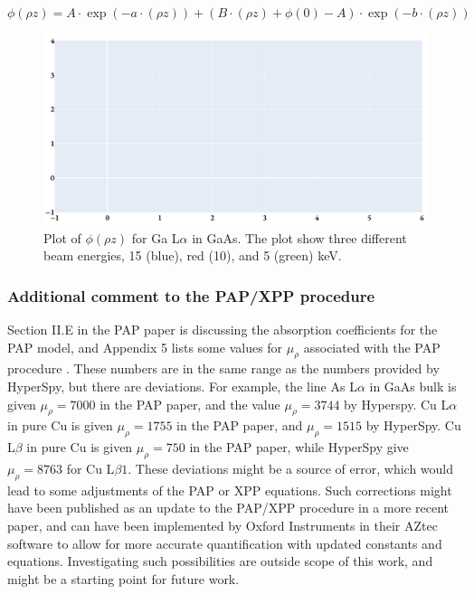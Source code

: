 
\begin{equation}
    \label{eq:theory:quantitative:pap:phi_of_rho_z}
    \phi (\rho z) = A \cdot \exp(- a \cdot (\rho z)) + (B \cdot (\rho z) + \phi(0) - A) \cdot \exp(- b \cdot (\rho z))
\end{equation}


\begin{figure}[htbp]
    \centering
    \includegraphics[width=0.8\linewidth]{figures/PAP_phi_of_rhoz.pdf}
    \caption{
        Plot of $\phi(\rho z)$ for Ga L$\alpha$ in GaAs.
        The plot show three different beam energies, 15 (blue), red (10), and 5 (green) keV.
    }
    \label{fig:pap:phi_of_rhoz}
\end{figure}






\subsubsection{Additional comment to the PAP/XPP procedure}

Section II.E in the PAP paper is discussing the absorption coefficients for the PAP model, and Appendix 5 lists some values for $\mu_\rho$ associated with the PAP procedure \cite{pap_1991}.
These numbers are in the same range as the numbers provided by HyperSpy, but there are deviations.
For example, the line As L$\alpha$ in GaAs bulk is given $\mu_\rho = 7000$ in the PAP paper, and the value $\mu_\rho = 3744$ by Hyperspy.
Cu L$\alpha$ in pure Cu is given $\mu_\rho = 1755$ in the PAP paper, and $\mu_\rho = 1515$ by HyperSpy.
Cu L$\beta$ in pure Cu is given $\mu_\rho = 750$ in the PAP paper, while HyperSpy give $\mu_\rho = 8763$ for Cu L$\beta1$.
These deviations might be a source of error, which would lead to some adjustments of the PAP or XPP equations.
Such corrections might have been published as an update to the PAP/XPP procedure in a more recent paper, and can have been implemented by Oxford Instruments in their AZtec software to allow for more accurate quantification with updated constants and equations.
Investigating such possibilities are outside scope of this work, and might be a starting point for future work.




